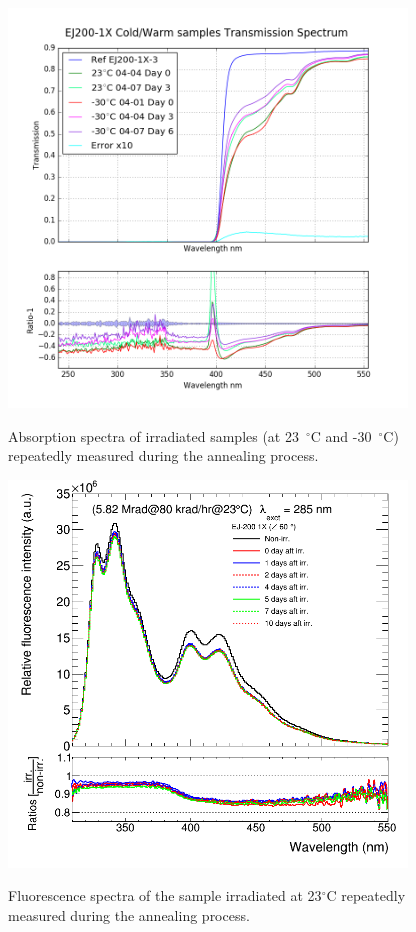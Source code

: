 \documentclass[preprint]{elsarticle}
\begin{document}
\begin{figure}[!ht]
	\centering
	\caption{Absorption spectra of irradiated samples (at 23~$^\circ$C and -30~$^\circ$C) repeatedly measured during the annealing process.}
	\includegraphics[width=300pt]{./figures/abs.png}
	\label{fig:abs}
\end{figure}

\begin{figure}[!ht]
	\centering
	\caption{Fluorescence spectra of the sample irradiated at 23$^\circ$C repeatedly measured during the annealing process.}
	\includegraphics[width=300pt]{./figures/appendix1.png}
	\label{fig:app1}
\end{figure}
\end{document}
